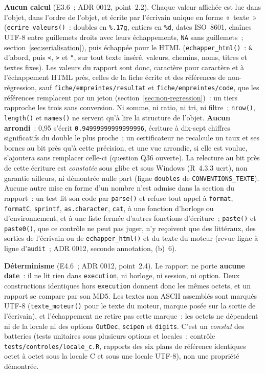 \documentclass[a4paper,11pt]{article}
\newcommand{\code}[1]{\texttt{\small #1}}
\begin{document}
\medskip
\noindent
\textbf{Aucun calcul} (E3.6~; ADR 0012, point~2.2). Chaque valeur affichée
est lue dans l'objet, dans l'ordre de l'objet, et écrite par l'écrivain
unique en forme «~texte~» (\code{ecrire\_valeurs()}~: doubles en
\code{\%.17g}, entiers en \code{\%d}, dates ISO~8601, chaînes UTF-8 entre
guillemets droits avec leurs échappements, \code{NA} sans guillemets~;
section~\ref{sec:serialisation}), puis échappée pour le HTML
(\code{echapper\_html()}~: \code{\&} d'abord, puis \code{<}, \code{>} et
\code{"}, sur tout texte inséré, valeurs, chemins, noms, titres et textes
fixes). Les valeurs du rapport sont donc, caractère pour caractère et à
l'échappement HTML près, celles de la fiche écrite et des références de
non-régression, sauf \code{fiche/empreintes/resultat} et
\code{fiche/empreintes/code}, que les références remplacent par un jeton
(section~\ref{sec:non-regression})~: un tiers
rapproche les trois sans conversion. Ni somme, ni ratio, ni tri, ni filtre~;
\code{nrow()}, \code{length()} et \code{names()} ne servent qu'à lire la
structure de l'objet. \textbf{Aucun arrondi}~: 0{,}95 s'écrit
\code{0.94999999999999996}, écriture à dix-sept chiffres significatifs du
double le plus proche~; un certificateur ne recalcule un taux et ses bornes
au bit près qu'à cette précision, et une vue arrondie, si elle est voulue,
s'ajoutera sans remplacer celle-ci (question Q36 ouverte). La relecture au
bit près de cette écriture est \emph{constatée} sous glibc et sous Windows
(R~4.3.3 ucrt), non garantie ailleurs, ni démontrée nulle part (ligne
\code{doubles} de \code{CONVENTIONS\_TEXTE}). Aucune autre
mise en forme d'un nombre n'est admise dans la section du rapport~: un test
lit son code par \code{parse()} et refuse tout appel à \code{format},
\code{formatC}, \code{sprintf}, \code{as.character}, \code{cat}, à une
fonction d'horloge ou d'environnement, et à une liste fermée d'autres
fonctions d'écriture~; \code{paste()} et \code{paste0()}, que ce contrôle
ne peut pas juger, n'y reçoivent que des littéraux, des sorties de
l'écrivain ou de \code{echapper\_html()} et du texte du moteur (revue ligne
à ligne d'\code{audit}~; ADR 0012, seconde annotation, (b)~6).

\medskip
\noindent
\textbf{Déterminisme} (E4.6~; ADR 0012, point~2.4). Le rapport ne porte
\textbf{aucune date}~: il ne lit rien dans \code{execution}, ni horloge, ni
session, ni option. Deux constructions identiques hors \code{execution}
donnent donc les mêmes octets, et un rapport se compare par son MD5. Les
textes non ASCII assemblés sont marqués UTF-8 (\code{texte\_moteur()} pour
le texte du moteur, marque posée sur la sortie de l'écrivain), et
l'échappement ne retire pas cette marque~: les octets ne dépendent ni de la
locale ni des options \code{OutDec}, \code{scipen} et \code{digits}. C'est
un \emph{constat} des batteries (tests unitaires sous plusieurs options et
locales~; contrôle \code{tests/controles/locale\_c.R}, rapports des six
plans de référence identiques octet à octet sous la locale C et sous une
locale UTF-8), non une propriété démontrée.
\end{document}

